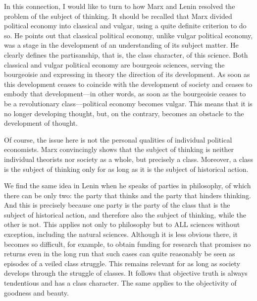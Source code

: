 \documentclass[12pt,a4paper,openany]{book}
\begin{document}
In this connection, I would like to turn to how Marx and Lenin resolved the problem of the subject of thinking. It should be recalled that Marx divided political economy into classical and vulgar, using a quite definite criterion to do so. He points out that classical political economy, unlike vulgar political economy, was a stage in the development of an understanding of its subject matter. He clearly defines the partisanship, that is, the class character, of this science. Both classical and vulgar political economy are bourgeois sciences, serving the bourgeoisie and expressing in theory the direction of its development. As soon as this development ceases to coincide with the development of society and ceases to embody that development—in other words, as soon as the bourgeoisie ceases to be a revolutionary class—political economy becomes vulgar. This means that it is no longer developing thought, but, on the contrary, becomes an obstacle to the development of thought.

Of course, the issue here is not the personal qualities of individual political economists. Marx convincingly shows that the subject of thinking is neither individual theorists nor society as a whole, but precisely a class. Moreover, a class is the subject of thinking only for as long as it is the subject of historical action.

We find the same idea in Lenin when he speaks of parties in philosophy, of which there can be only two: the party that thinks and the party that hinders thinking. And this is precisely because one party is the party of the class that is the subject of historical action, and therefore also the subject of thinking, while the other is not. This applies not only to philosophy but to ALL sciences without exception, including the natural sciences. Although it is less obvious there, it becomes so difficult, for example, to obtain funding for research that promises no returns even in the long run that such cases can quite reasonably be seen as episodes of a veiled class struggle. This remains relevant for as long as society develops through the struggle of classes. It follows that objective truth is always tendentious and has a class character. The same applies to the objectivity of goodness and beauty.
\end{document}
